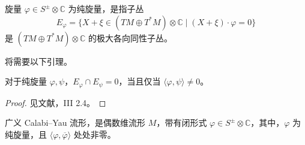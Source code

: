 \begin{definition*}[纯旋量]
旋量 $\varphi\in S^\pm\otimes\mathbb C$ 为纯旋量，是指子丛
\[
E_\varphi=\{X+\xi\in(TM\oplus T^*M)\otimes\mathbb C
\mid(X+\xi)\cdot\varphi=0\}
\]
是 $(TM\oplus T^*M)\otimes\mathbb C$ 的极大各向同性子丛。
\end{definition*}

将需要以下引理。

\begin{lemma}\label{lem:6.35}
对于纯旋量 $\varphi,\psi$，$E_\varphi\cap E_\psi=0$，当且仅当 $\langle\varphi,\psi\rangle\ne0$。
\end{lemma}
\begin{proof}
见文献，III 2.4。
\end{proof}

\begin{definition}\label{def:6.36}
广义 Calabi--Yau 流形，是偶数维流形 $M$，带有闭形式 $\varphi\in S^\pm\otimes\mathbb C$，其中，$\varphi$ 为纯旋量，且 $\langle\varphi,\overline\varphi\rangle$ 处处非零。
\end{definition}

